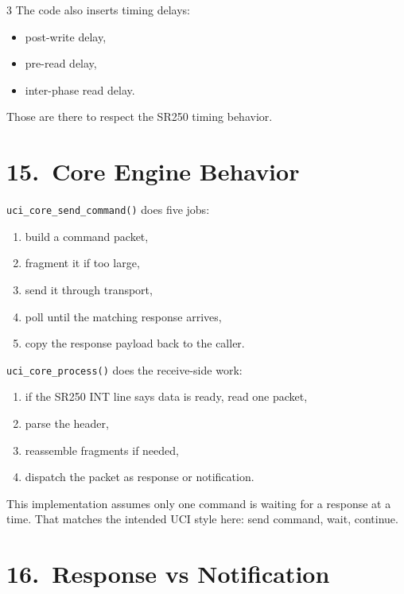 \documentclass[10pt]{article}
\begin{document}
\begin{multicols*}{3}
The code also inserts timing delays:
\begin{itemize}
  \item post-write delay,
  \item pre-read delay,
  \item inter-phase read delay.
\end{itemize}
Those are there to respect the SR250 timing behavior.

\section*{15.\ Core Engine Behavior}

\texttt{uci\_core\_send\_command()} does five jobs:
\begin{enumerate}
  \item build a command packet,
  \item fragment it if too large,
  \item send it through transport,
  \item poll until the matching response arrives,
  \item copy the response payload back to the caller.
\end{enumerate}

\texttt{uci\_core\_process()} does the receive-side work:
\begin{enumerate}
  \item if the SR250 INT line says data is ready, read one packet,
  \item parse the header,
  \item reassemble fragments if needed,
  \item dispatch the packet as response or notification.
\end{enumerate}

\begin{tcolorbox}[summarybox={Single Outstanding Command Window}]
This implementation assumes only one command is waiting for a response at a time.
That matches the intended UCI style here: send command, wait, continue.
\end{tcolorbox}

\section*{16.\ Response vs Notification}


\end{multicols*}
\end{document}
